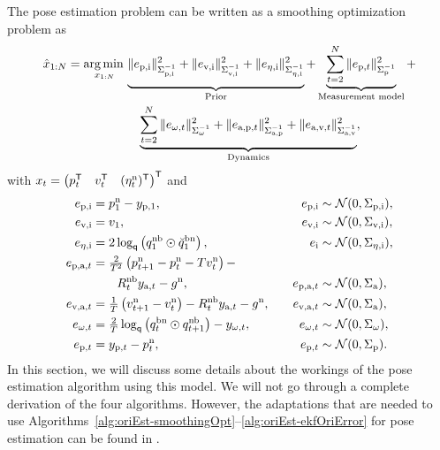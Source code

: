 The pose estimation problem can be written as a smoothing optimization problem as 
\begin{align}
\label{eq:oriEst-posSmoothing}
\hat{x}_{1:N} = \argmin_{x_{1:N}} &\underbrace{\vphantom{\sum_{t = 2}^N} \| e_{\text{p,i}} \|_{\Sigma_{\text{p,i}}^{-1}}^2 + \| e_{\text{v,i}} \|_{\Sigma_{\text{v,i}}^{-1}}^2 + \| e_{\oriError,\text{i}} \|_{\Sigma_{\oriError,\text{i}}^{-1}}^2}_{\text{Prior}} + \underbrace{\sum_{t = 2}^N \| e_{\text{p},t} \|_{\Sigma_\text{p}^{-1}}^2}_{\text{Measurement model}} + \nonumber \\
& \quad \underbrace{\sum_{t = 2}^N \| e_{\omega,t} \|_{\Sigma_\omega^{-1}}^2 + \| e_{\text{a,p},t} \|_{\Sigma_\text{a,p}^{-1}}^2 + \| e_{\text{a,v},t} \|_{\Sigma_\text{a,v}^{-1}}^2}_{\text{Dynamics}},
\end{align}
with $x_t = \begin{pmatrix} p_t^{\mathsf{T}} & v_t^{\mathsf{T}} & (\eta_t^\text{n})^{\mathsf{T}} \end{pmatrix}^{\mathsf{T}}$ and
\begin{subequations}
\label{eq:oriEst-poseSmoothingTerms}
\begin{align}
e_\text{p,i} &= p_1^\text{n} - y_{\text{p},1}, \quad & e_{\text{p,i}} &\sim \mathcal{N}(0,\Sigma_\text{p,i}), \\
e_\text{v,i} &= v_1, \quad & e_{\text{v,i}} &\sim \mathcal{N}(0,\Sigma_\text{v,i}), \\
e_{\eta,\text{i}} &=  2 \log_\mathsf{q} \left( q_1^\text{nb} \odot \breve{q}_1^\text{bn} \right), \quad & e_{\text{i}} &\sim \mathcal{N}(0,\Sigma_{\eta,\text{i}}), \\
e_{\text{p,a},t} &= \tfrac{2}{T^2} \left( p_{t+1}^\text{n} - p_t^\text{n} - T v_t^\text{n} \right) - & &\nonumber \\
 & \qquad R^\text{nb}_t y_{\text{a},t} -  g^\text{n}, \quad & e_{\text{p,a},t} &\sim \mathcal{N}(0,\Sigma_\text{a}), \label{eq:oriEst-poseSmoothingTerms-posDyn} \\
e_{\text{v,a},t} &= \tfrac{1}{T} \left( v_{t+1}^\text{n} - v_t^\text{n} \right) - R^\text{nb}_t y_{\text{a},t} -  g^\text{n}, \quad & e_{\text{v,a},t} &\sim \mathcal{N}(0,\Sigma_\text{a}), \label{eq:oriEst-poseSmoothingTerms-velDyn} \\
e_{\omega,t} &= \tfrac{2}{T} \log_\mathsf{q} \left( q_t^\text{bn} \odot q^\text{nb}_{t+1}\right) - y_{\omega,t}, \quad & e_{\omega,t} &\sim \mathcal{N}(0,\Sigma_\omega),  \\
e_{\text{p},t} &= y_{\text{p},t} - p^\text{n}_t, \quad & e_{\text{p},t} &\sim \mathcal{N}(0,\Sigma_\text{p}). 
\end{align}
\end{subequations}
In this section, we will discuss some details about the workings of the pose estimation algorithm using this model. We will not go through a complete derivation of the four algorithms. However, the adaptations that are needed to use Algorithms~\ref{alg:oriEst-smoothingOpt}--\ref{alg:oriEst-ekfOriError} for pose estimation can be found in . 


